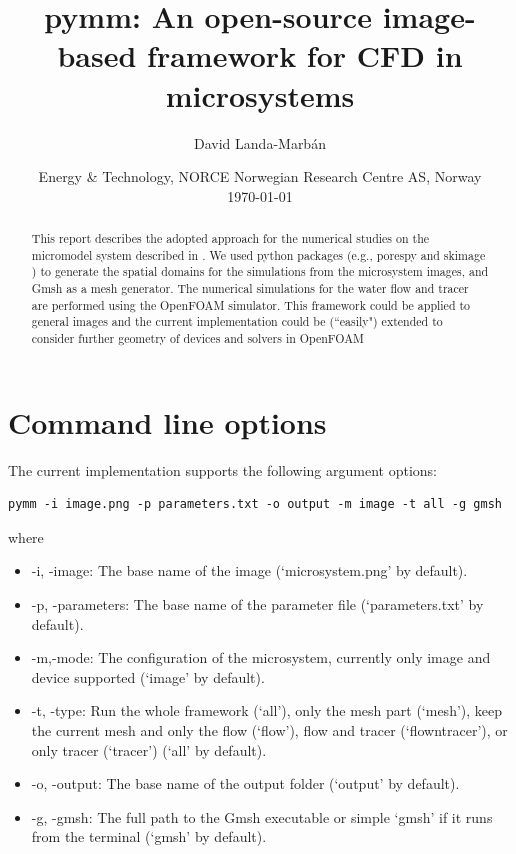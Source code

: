 \documentclass[10pt]{article}
\title{pymm: An open-source image-based framework for CFD in microsystems}
\author{David Landa-Marb\'an}
\date{%
	Energy \& Technology, NORCE Norwegian Research Centre AS, Norway\\
    \today
}
\begin{document}
\maketitle
\onehalfspace
\vspace{2cm}
\begin{abstract}
\noindent This report describes the adopted approach for the numerical studies on the micromodel system described in \cite{Benali2019,Liu2022}. We used python packages (e.g., porespy \citep{Gostick2019} and skimage \citep{Walt2014}) to generate the spatial domains for the simulations from the microsystem images, and Gmsh \citep{Geuzaine2009} as a mesh generator. The numerical simulations for the water flow and tracer are performed using the OpenFOAM simulator. This framework could be applied to general images and the current implementation could be (``easily") extended to consider further geometry of devices and solvers in OpenFOAM \end{abstract}
\vspace{1.4cm}

\section{Command line options}

The current implementation supports the following argument options:
\begin{lstlisting}[style=DOS]
pymm -i image.png -p parameters.txt -o output -m image -t all -g gmsh
\end{lstlisting}

where
\begin{itemize}
\item -i, -image: The base name of the image (`microsystem.png' by default).
\item -p, -parameters: The base name of the parameter file (`parameters.txt' by default).
\item -m,-mode: The configuration of the microsystem, currently only image and device supported (`image' by default).
\item -t, -type: Run the whole framework (`all'), only the mesh part (`mesh'), keep the current mesh and only the flow (`flow'), flow and tracer (`flowntracer'), or only tracer (`tracer') (`all' by default).
\item -o, -output: The base name of the output folder (`output' by default).
\item -g, -gmsh: The full path to the Gmsh executable or simple `gmsh' if it runs from the terminal (`gmsh' by default).
\end{itemize}
\end{document}
